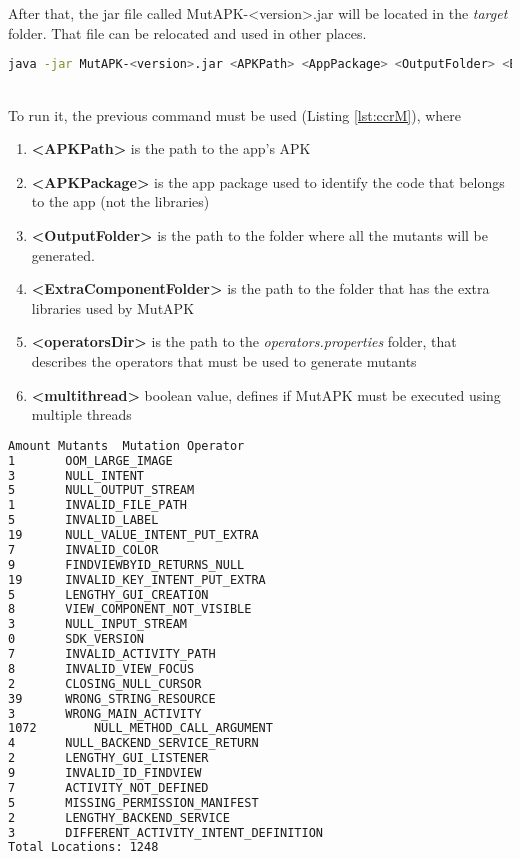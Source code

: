 After that, the  jar file called MutAPK-<version>.jar will be located in the \textit{target} folder. That file can be relocated and used in other places. 

\begin{minipage}{\linewidth}
	\begin{lstlisting}[language={sh}, label={lst:ccrM}, caption={Console command to run MutAPK}, numbers=none]
java -jar MutAPK-<version>.jar <APKPath> <AppPackage> <OutputFolder> <ExtraComponentFolder> <operatorsDir> <multithread>
	\end{lstlisting}
\end{minipage}\\

To run it, the previous command must be used (Listing \ref{lst:ccrM}),  where
\begin{enumerate}
	\item \textbf{<APKPath>} is the path to the app's APK
	\item \textbf{<APKPackage>} is the app package used to identify the code that belongs to the app (not the libraries)
	\item \textbf{<OutputFolder>} is the path to the folder where all the mutants will be generated.
	\item \textbf{<ExtraComponentFolder>} is the path to the folder that has the extra libraries used by MutAPK
	\item \textbf{<operatorsDir>} is the path to the \textit{operators.properties} folder, that describes the operators that must be used to generate mutants
	\item \textbf{<multithread>} boolean value, defines if MutAPK must be executed using multiple threads
\end{enumerate}
\begin{minipage}{\textwidth}
	\begin{lstlisting}[language={sh}, label={lst:eompa}, caption={Example Output of MutAPK for PhotoStream app}, numbers=none]
Amount Mutants	Mutation Operator
1		OOM_LARGE_IMAGE
3		NULL_INTENT
5		NULL_OUTPUT_STREAM
1		INVALID_FILE_PATH
5		INVALID_LABEL
19		NULL_VALUE_INTENT_PUT_EXTRA
7		INVALID_COLOR
9		FINDVIEWBYID_RETURNS_NULL
19		INVALID_KEY_INTENT_PUT_EXTRA
5		LENGTHY_GUI_CREATION
8		VIEW_COMPONENT_NOT_VISIBLE
3		NULL_INPUT_STREAM
0		SDK_VERSION
7		INVALID_ACTIVITY_PATH
8		INVALID_VIEW_FOCUS
2		CLOSING_NULL_CURSOR
39		WRONG_STRING_RESOURCE
3		WRONG_MAIN_ACTIVITY
1072		NULL_METHOD_CALL_ARGUMENT
4		NULL_BACKEND_SERVICE_RETURN
2		LENGTHY_GUI_LISTENER
9		INVALID_ID_FINDVIEW
7		ACTIVITY_NOT_DEFINED
5		MISSING_PERMISSION_MANIFEST
2		LENGTHY_BACKEND_SERVICE
3		DIFFERENT_ACTIVITY_INTENT_DEFINITION
Total Locations: 1248
	\end{lstlisting}
\end{minipage}\\

